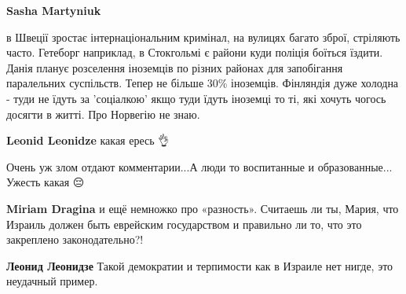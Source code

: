 \begin{itemize}
\begin{itemize}
\textbf{Sasha Martyniuk} 

в Швеції зростає інтернаціональним кримінал, на вулицях багато зброї, стріляють
часто. Гетеборг наприклад, в Стокгольмі є райони куди поліція боїться їздити.
Данія планує розселення іноземців по різних районах для запобігання паралельних
суспільств. Тепер не більше 30\% іноземців. Фінляндія дуже холодна - туди не
їдуть за 'соціалкою' якщо туди їдуть іноземці то ті, які хочуть чогось досягти
в житті. Про Норвегію не знаю.


 
\textbf{Leonid Leonidze} какая ересь 👌\Laughey[1.0][white]

\end{itemize}

 
Очень уж злом отдают комментарии...А люди то воспитанные и образованные... Ужесть какая 😔

 
\textbf{Miriam Dragina} и ещё немножко про «разность». Считаешь ли ты, Мария, что Израиль должен быть еврейским государством и правильно ли то, что это закреплено законодательно?!

\begin{itemize}
 
\textbf{Леонид Леонидзе} Такой демократии и терпимости как в Израиле нет нигде, это неудачный пример.

 

\end{itemize}
\end{itemize}
